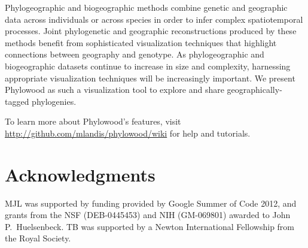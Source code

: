 \documentclass[11pt]{article}
\begin{document}
Phylogeographic and biogeographic methods combine genetic and geographic data across individuals or across species in order to infer complex spatiotemporal processes. Joint phylogenetic and geographic reconstructions produced by these methods benefit from sophisticated visualization techniques that highlight connections between geography and genotype. As phylogeographic and biogeographic datasets continue to increase in size and complexity, harnessing appropriate visualization techniques will be increasingly important. We present Phylowood as such a visualization tool to explore and share geographically-tagged phylogenies. 

To learn more about Phylowood's features, visit \url{http://github.com/mlandis/phylowood/wiki} for help and tutorials.

\section*{Acknowledgments}

MJL was supported by funding provided by Google Summer of Code 2012, and grants from the NSF (DEB-0445453) and NIH (GM-069801) awarded to John P.\ Huelsenbeck.  TB was supported by a Newton International Fellowship from the Royal Society.  



\newpage
\newpage
\end{document}
